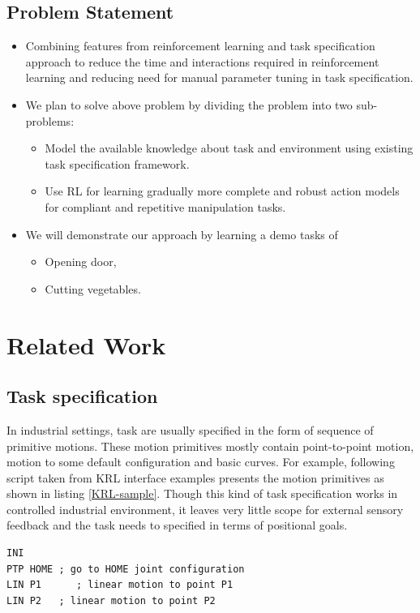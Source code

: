 \documentclass[thesis]{mas_proposal}
\begin{document}
\section{Problem Statement}
\begin{itemize}
	\item Combining features from reinforcement learning and task specification approach to reduce the time and interactions required in reinforcement learning and reducing need for manual parameter tuning in task specification.
	\item We plan to solve above problem by dividing the problem into two sub-problems:
	\begin{itemize}
		\item Model the available knowledge about task and environment using existing task specification framework.
		\item Use RL for learning gradually more complete and robust action models for compliant and repetitive manipulation tasks.
	\end{itemize}
    \item We will demonstrate our approach by learning a demo tasks of 
    \begin{itemize}
    	\item Opening door,
    	\item Cutting vegetables.
    \end{itemize}
\end{itemize}


\chapter{Related Work}
\section{Task specification}
In industrial settings, task are usually specified in the form of sequence of primitive motions\cite{leidner2017cognitive}. These motion primitives mostly contain point-to-point motion, motion to some default configuration and basic curves. For example, following script taken from KRL interface examples presents the motion primitives as shown in listing \ref{KRL-sample}. Though this kind of task specification works in controlled industrial environment, it leaves very little scope for external sensory feedback and the task needs to specified in terms of positional goals.

\begin{lstlisting}[label=KRL-sample,caption=KUKA Robot Language code]
INI
PTP HOME ; go to HOME joint configuration
LIN P1      ; linear motion to point P1
LIN P2	 ; linear motion to point P2
\end{lstlisting}
\end{document}
